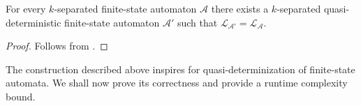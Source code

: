 \begin{theorem}
  For every $k$-separated finite-state automaton $\mathcal{A}$ there exists a
  $k$-separated quasi-deterministic finite-state automaton $\mathcal{A}'$ such that
  $\mathcal{L}_{\mathcal{A}'} = \mathcal{L}_\mathcal{A}$.
\end{theorem}

\begin{proof}
  Follows from .
\end{proof}

The construction described above inspires  for
quasi-determinization of finite-state automata. We shall now prove its correctness
and provide a runtime complexity bound.
\pagebreak

